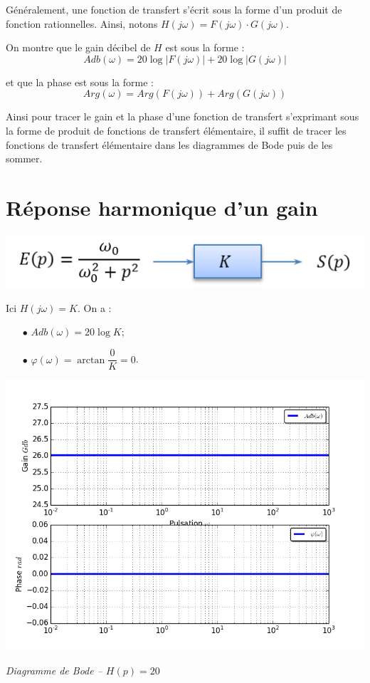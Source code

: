 \documentclass[10pt,oneside]{article}
\begin{document}
Généralement, une fonction de transfert s'écrit sous la forme d'un produit de fonction rationnelles. Ainsi, notons $H(j\omega)=F(j\omega) \cdot G(j\omega)$. 

On montre que le gain décibel de $H$ est sous la forme :
$$
Adb(\omega) = 20 \log |F(j\omega) |+20 \log |G(j\omega) |
$$

et que la phase est sous la forme :
$$
Arg(\omega) = Arg \left(F(j\omega) \right)+Arg \left(G(j\omega) \right)
$$

Ainsi pour tracer le gain et la phase d'une fonction de transfert s'exprimant sous la forme de produit de fonctions de transfert élémentaire, il suffit de tracer les fonctions de transfert élémentaire dans les diagrammes de Bode puis de les sommer.

\section{Réponse harmonique d'un gain}

\begin{minipage}[c]{.48\linewidth}
\begin{center}
\includegraphics[width=.9\textwidth]{png/gain_bloc}
\end{center}

Ici $H(j\omega)=K$. On a :
\begin{itemize}
\item [$\bullet$] $Adb(\omega)=20 \log K$;
\item [$\bullet$] $\varphi(\omega)= \arctan \dfrac{0}{K} = 0$.
\end{itemize}
\end{minipage}\hfill
\begin{minipage}[c]{.48\linewidth}
\begin{center}
\includegraphics[width=.9\textwidth]{png/gain_bode}

\textit{Diagramme de Bode -- $H(p)=20$}
\end{center}
\end{minipage}
\end{document}
